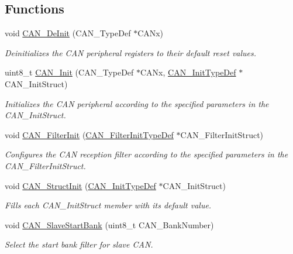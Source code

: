 \subsection*{Functions}
\begin{DoxyCompactItemize}
\item 
void \hyperlink{group___c_a_n_ga002b74cd69574a14b17ad445090245cd}{C\-A\-N\-\_\-\-De\-Init} (C\-A\-N\-\_\-\-Type\-Def $\ast$C\-A\-Nx)
\begin{DoxyCompactList}\small\item\em Deinitializes the C\-A\-N peripheral registers to their default reset values. \end{DoxyCompactList}\item 
uint8\-\_\-t \hyperlink{group___c_a_n_ga9023c35a9ab931ad4513fc5d19b4bd6c}{C\-A\-N\-\_\-\-Init} (C\-A\-N\-\_\-\-Type\-Def $\ast$C\-A\-Nx, \hyperlink{struct_c_a_n___init_type_def}{C\-A\-N\-\_\-\-Init\-Type\-Def} $\ast$C\-A\-N\-\_\-\-Init\-Struct)
\begin{DoxyCompactList}\small\item\em Initializes the C\-A\-N peripheral according to the specified parameters in the C\-A\-N\-\_\-\-Init\-Struct. \end{DoxyCompactList}\item 
void \hyperlink{group___c_a_n_ga39476830280340363c51041be6b12647}{C\-A\-N\-\_\-\-Filter\-Init} (\hyperlink{struct_c_a_n___filter_init_type_def}{C\-A\-N\-\_\-\-Filter\-Init\-Type\-Def} $\ast$C\-A\-N\-\_\-\-Filter\-Init\-Struct)
\begin{DoxyCompactList}\small\item\em Configures the C\-A\-N reception filter according to the specified parameters in the C\-A\-N\-\_\-\-Filter\-Init\-Struct. \end{DoxyCompactList}\item 
void \hyperlink{group___c_a_n_gad77ad810868ed111755fc9e8ae0c7646}{C\-A\-N\-\_\-\-Struct\-Init} (\hyperlink{struct_c_a_n___init_type_def}{C\-A\-N\-\_\-\-Init\-Type\-Def} $\ast$C\-A\-N\-\_\-\-Init\-Struct)
\begin{DoxyCompactList}\small\item\em Fills each C\-A\-N\-\_\-\-Init\-Struct member with its default value. \end{DoxyCompactList}\item 
void \hyperlink{group___c_a_n_ga109ff8960bc59f44b984c9646f17b3c0}{C\-A\-N\-\_\-\-Slave\-Start\-Bank} (uint8\-\_\-t C\-A\-N\-\_\-\-Bank\-Number)
\begin{DoxyCompactList}\small\item\em Select the start bank filter for slave C\-A\-N. \end{DoxyCompactList}\item 

\end{DoxyCompactItemize}
